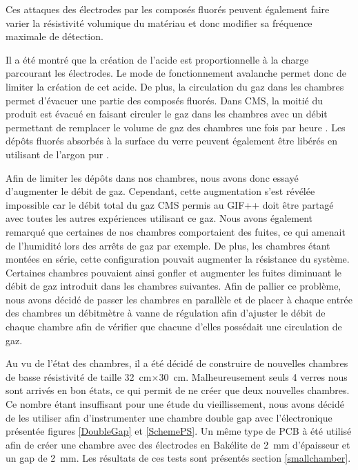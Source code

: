 Ces attaques des électrodes par les composés fluorés peuvent également faire varier la résistivité volumique du matériau et donc modifier sa fréquence maximale de détection.

Il a été montré que la création de l'acide  est proportionnelle à la charge parcourant les électrodes. Le mode de fonctionnement avalanche permet donc de limiter la création de cet acide. De plus, la circulation du gaz dans les chambres permet d'évacuer une partie des composés fluorés. Dans CMS, la moitié du  produit est évacué en faisant circuler le gaz dans les chambres avec un débit permettant de remplacer le volume de gaz des chambres une fois par heure \cite{Abbrescia:2006hk}. Les dépôts fluorés absorbés à la surface du verre peuvent également être libérés en utilisant de l'argon pur \cite{Band:2008zza}.

Afin de limiter les dépôts dans nos chambres, nous avons donc essayé d'augmenter le débit de gaz. Cependant, cette augmentation s'est révélée impossible car le débit total du gaz CMS permis au GIF++ doit être partagé avec toutes les autres expériences utilisant ce gaz.
Nous avons également remarqué que certaines de nos chambres comportaient des fuites, ce qui amenait de l'humidité lors des arrêts de gaz par exemple. De plus, les chambres étant montées en série, cette configuration pouvait augmenter la résistance du système. Certaines chambres pouvaient ainsi gonfler et augmenter les fuites diminuant le débit de gaz introduit dans les chambres suivantes. Afin de pallier ce problème, nous avons décidé de passer les chambres en parallèle et de placer à chaque entrée des chambres un débitmètre à vanne de régulation afin d'ajuster le débit de chaque chambre afin de vérifier que chacune d'elles possédait une circulation de gaz.

Au vu de l'état des chambres, il a été décidé de construire de nouvelles chambres de basse résistivité de taille \SI{32}{\centi\meter}$\times$\SI{30}{\centi\meter}. Malheureusement seuls \num{4} verres nous sont arrivés en bon états, ce qui permit de ne créer que deux nouvelles chambres. Ce nombre étant insuffisant pour une étude du vieillissement, nous avons décidé de les utiliser afin d'instrumenter une chambre double gap avec l'électronique présentée figures \ref{DoubleGap} et \ref{SchemePS}. Un même type de PCB à été utilisé afin de créer une chambre avec des électrodes en Bakélite de \SI{2}{\milli\meter} d'épaisseur et un gap de \SI{2}{\milli\meter}. Les résultats de ces tests sont présentés section \ref{smallchamber}.

